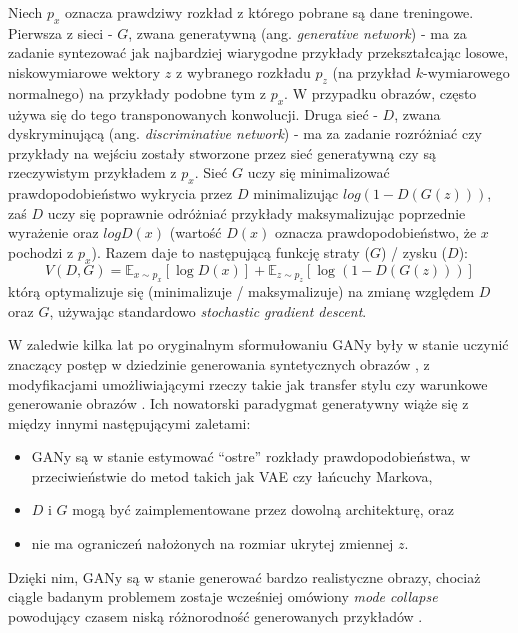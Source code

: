 \documentclass[magisterska]{pracamgr}
\begin{document}
Niech $p_x$ oznacza prawdziwy rozkład z którego pobrane są dane treningowe. Pierwsza z sieci - $G$, zwana generatywną (ang. \textit{generative network}) - ma za zadanie syntezować jak najbardziej wiarygodne przykłady przekształcając losowe, niskowymiarowe wektory $z$ z wybranego rozkładu $p_z$ (na przykład $k$-wymiarowego normalnego) na przykłady podobne tym z $p_x$. W przypadku obrazów, często używa się do tego transponowanych konwolucji. Druga sieć - $D$, zwana dyskryminującą (ang. \textit{discriminative network}) - ma za zadanie rozróżniać czy przykłady na wejściu zostały stworzone przez sieć generatywną czy są rzeczywistym przykładem z $p_x$. Sieć $G$ uczy się minimalizować prawdopodobieństwo wykrycia przez $D$ minimalizując $log(1 - D(G(z)))$, zaś $D$ uczy się poprawnie odróżniać przykłady maksymalizując poprzednie wyrażenie oraz $log D(x)$ (wartość $D(x)$ oznacza prawdopodobieństwo, że $x$ pochodzi z $p_x$). Razem daje to następującą funkcję straty ($G$) / zysku ($D$):
\begin{equation}
    V(D, G) = \mathbb{E}_{x \sim p_x}[\log D(x)] + \mathbb{E}_{z \sim p_z}[\log(1 - D(G(z)))]
\end{equation}
którą optymalizuje się (minimalizuje / maksymalizuje) na zmianę względem $D$ oraz $G$, używając standardowo \textit{stochastic gradient descent}.

W zaledwie kilka lat po oryginalnym sformułowaniu GANy były w stanie uczynić znaczący postęp w dziedzinie generowania syntetycznych obrazów \cite{karras2019stylegan} \cite{karras2020stylegan2}, z modyfikacjami umożliwiającymi rzeczy takie jak transfer stylu \cite{abdal2019image2stylegan} czy warunkowe generowanie obrazów \cite{zhu2020cyclegan}. Ich nowatorski paradygmat generatywny wiąże się z między innymi następującymi zaletami:
\begin{itemize}
    \setlength\itemsep{0em}
    \item GANy są w stanie estymować "`ostre"' rozkłady prawdopodobieństwa, w przeciwieństwie do metod takich jak VAE czy łańcuchy Markova,
    \item $D$ i $G$ mogą być zaimplementowane przez dowolną architekturę, oraz
    \item nie ma ograniczeń nałożonych na rozmiar ukrytej zmiennej $z$.
\end{itemize}
Dzięki nim, GANy są w stanie generować bardzo realistyczne obrazy, chociaż ciągle badanym problemem zostaje wcześniej omówiony \textit{mode collapse} powodujący czasem niską różnorodność generowanych przykładów \cite{wang2020gansurvey}.
\end{document}
